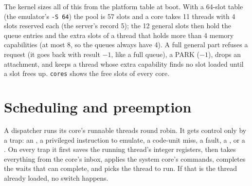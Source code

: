 The kernel sizes all of this from the platform table at boot. With a 64-slot table (the emulator's
\texttt{-S 64}) the pool is 57 slots and a core takes 11 threads with 4 slots reserved each (the
server's record 5); the 12 general slots then hold the queue entries and the extra slots of a thread
that holds more than 4 memory capabilities (at most 8, so the queues always have 4). A full general
part refuses a request (it goes back with result $-1$, like a full queue), a PARK ($-1$), drops an
attachment, and keeps a thread whose extra capability finds no slot loaded until a slot frees up.
\texttt{cores} shows the free slots of every core.

\section{Scheduling and preemption}\label{sec:os-preempt}

A dispatcher runs its core's runnable threads round robin. It gets control only by a trap: an
, a privileged instruction to emulate, a code-unit miss, a fault, a , or a
. On every trap it first saves the running thread's integer registers, then takes
everything from the core's inbox, applies the system core's commands, completes the waits that can
complete, and picks the thread to run. If that is the thread already loaded, no switch happens.

